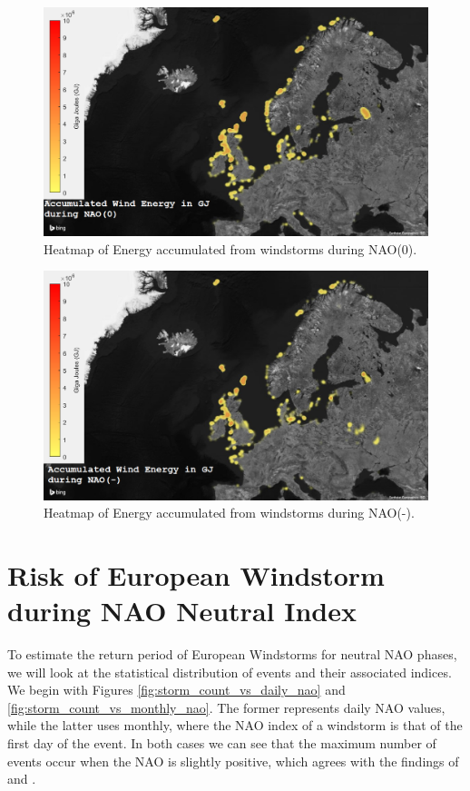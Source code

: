     \begin{figure}
        \centering
        \includegraphics[width=\textwidth]{figures/NAONeutral.png}
        \caption{Heatmap of Energy accumulated from windstorms during NAO(0).}
        \label{fig:naoneutralmapo}
    \end{figure}

    \begin{figure}
        \centering
        \includegraphics[width=\textwidth]{figures/NAONegative.png}
        \caption{Heatmap of Energy accumulated from windstorms during NAO(-).}
        \label{fig:naonegativemapenter-label}
    \end{figure}



\FloatBarrier
\section{Risk of European Windstorm during NAO Neutral Index}

    To estimate the return period of European Windstorms for neutral NAO phases, we will look at the statistical distribution of events and their associated indices. We begin with Figures \ref{fig:storm_count_vs_daily_nao} and \ref{fig:storm_count_vs_monthly_nao}. The former represents daily NAO values, while the latter uses monthly, where the NAO index of a windstorm is that of the first day of the event. In both cases we can see that the maximum number of events occur when the NAO is slightly positive, which agrees with the findings of \cite{https://doi.org/10.1002/joc.1982} and \cite{https://doi.org/10.1002/2014GL059647}. 

